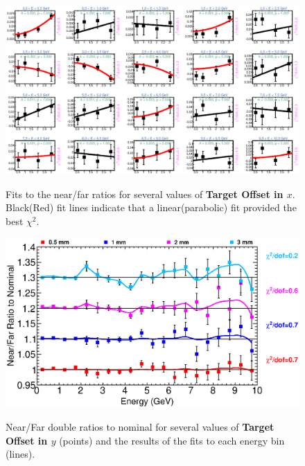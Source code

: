 {\begin{figure}[ht]
  \begin{center}
    {\includegraphics[width=5.0in]{figures/TargetXOffset_nof_fits.eps}}
  \end{center}
\caption{ Fits to the near/far ratios for several values of {\bf Target Offset in $x$}. Black(Red) fit lines indicate that a linear(parabolic) fit provided the best $\chi^2$. }
\end{figure}

\begin{figure}[ht]
  \begin{center}
    {\includegraphics[width=6.0in]{figures/TargetYOffset_nof_summary.eps}}
  \end{center}
\caption{ Near/Far double ratios to nominal for several values of {\bf Target Offset in $y$} (points) and the results of the fits to each energy bin (lines).}
\end{figure}

}
